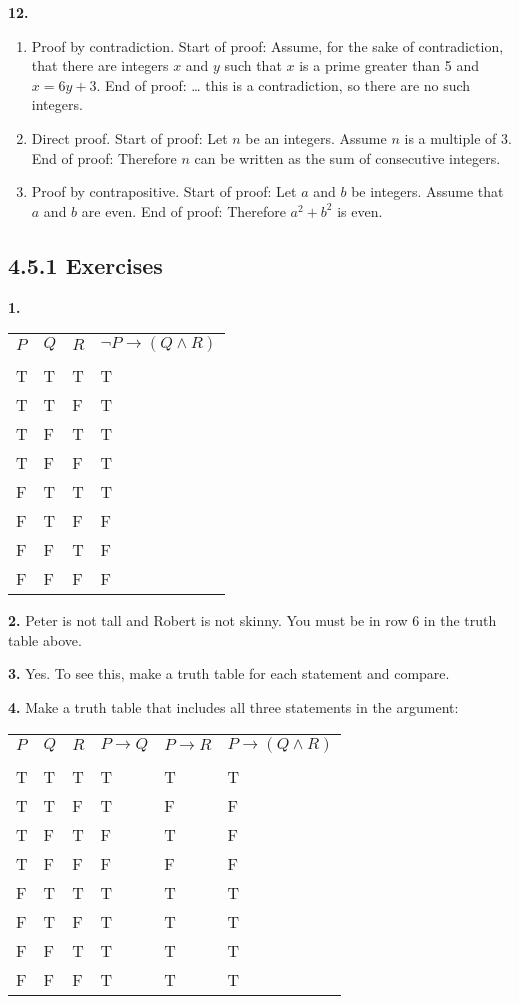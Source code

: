 \documentclass[10pt,]{book}
\theoremstyle{plain}
\theoremstyle{definition}
\theoremstyle{definition}
\theoremstyle{definition}
\numberwithin{equation}{chapter}
\newcommand{\hrulethin}  {\noalign{\hrule height 0.04em}}
\def\imp{\rightarrow}
\begin{document}
\par\smallskip
\noindent\textbf{12.}\quad{}\leavevmode%
\begin{enumerate}[label=(\alph*)]
\item\hypertarget{li-1116}{}
Proof by contradiction.  Start of proof: Assume, for the sake of contradiction, that there are integers \(x\) and \(y\) such that \(x\) is a prime greater than 5 and \(x = 6y + 3\).  End of proof: \dots{} this is a contradiction, so there are no such integers.
%
\item\hypertarget{li-1117}{}
Direct proof.  Start of proof: Let \(n\) be an integers.  Assume \(n\) is a multiple of 3.  End of proof: Therefore \(n\) can be written as the sum of consecutive integers.
%
\item\hypertarget{li-1118}{}
Proof by contrapositive.  Start of proof: Let \(a\) and \(b\) be integers.  Assume that \(a\) and \(b\) are even.  End of proof: Therefore \(a^2 + b^2\) is even.
%
\end{enumerate}
\par\smallskip
\subsection*{4.5.1 Exercises}
\noindent\textbf{1.}\quad{}\begin{tabular}{llll}
\(P\)&\(Q\)&\(R\)&\(\neg P \imp (Q \wedge R)\)\tabularnewline[0pt]
&&&\tabularnewline\hrulethin
T&T&T&T\tabularnewline[0pt]
T&T&F&T\tabularnewline[0pt]
T&F&T&T\tabularnewline[0pt]
T&F&F&T\tabularnewline[0pt]
F&T&T&T\tabularnewline[0pt]
F&T&F&F\tabularnewline[0pt]
F&F&T&F\tabularnewline[0pt]
F&F&F&F
\end{tabular}
\par\smallskip
\noindent\textbf{2.}\quad{}
            Peter is not tall and Robert is not skinny. You must be in row 6 in the truth table above.
\par\smallskip
\noindent\textbf{3.}\quad{}
            Yes. To see this, make a truth table for each statement and compare.
\par\smallskip
\noindent\textbf{4.}\quad{}
            Make a truth table that includes all three statements in the argument:
\begin{tabular}{llllll}
\(P\)&\(Q\)&\(R\)&\(P \imp Q\)&\(P \imp R\)&\(P \imp (Q \wedge R)\)\tabularnewline[0pt]
&&&&&\tabularnewline\hrulethin
T&T&T&T&T&T\tabularnewline[0pt]
T&T&F&T&F&F\tabularnewline[0pt]
T&F&T&F&T&F\tabularnewline[0pt]
T&F&F&F&F&F\tabularnewline[0pt]
F&T&T&T&T&T\tabularnewline[0pt]
F&T&F&T&T&T\tabularnewline[0pt]
F&F&T&T&T&T\tabularnewline[0pt]
F&F&F&T&T&T
\end{tabular}
\par
\end{document}
